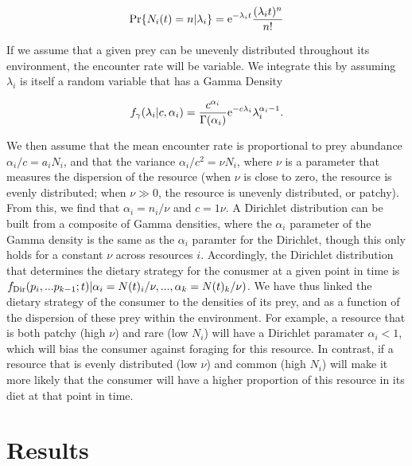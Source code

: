 \documentclass[11pt]{article}
\begin{document}
\begin{equation}
{\rm Pr}\{N_i(t) = n | \lambda_i\} = {\rm e}^{-\lambda_i t}\frac{(\lambda_i t)^n}{n!}
\end{equation}

If we assume that a given prey can be unevenly distributed throughout its environment, the encounter rate will be variable.
We integrate this by assuming $\lambda_i$ is itself a random variable that has a Gamma Density

\begin{equation}
f_\gamma (\lambda_i | c, \alpha_i) = \frac{c^{\alpha_i}}{\Gamma (\alpha_i)}{\rm e}^{-c \lambda_i}\lambda_i^{\alpha_i - 1}.
\end{equation}

\noindent We then assume that the mean encounter rate is proportional to prey abundance $\alpha_i/c = a_i N_i$, and that the variance $\alpha_i/c^2 = \nu N_i$, where $\nu$ is a parameter that measures the dispersion of the resource (when $\nu$ is close to zero, the resource is evenly distributed; when $\nu \gg 0$, the resource is unevenly distributed, or patchy).
From this, we find that $\alpha_i = n_i/\nu$ and $c=1\nu$.
A Dirichlet distribution can be built from a composite of Gamma densities, where the $\alpha_i$ parameter of the Gamma density is the same as the $\alpha_i$ paramter for the Dirichlet, though this only holds for a constant $\nu$ across resources $i$.
Accordingly, the Dirichlet distribution that determines the dietary strategy for the conusmer at a given point in time is $f_{\rm Dir}(p_i,...p_{k-1};t) | \alpha_i=N(t)_i/\nu,...,\alpha_k=N(t)_k/\nu)$.
We have thus linked the dietary strategy of the consumer to the densities of its prey, and as a function of the dispersion of these prey within the environment.
For example, a resource that is both patchy (high $\nu$) and rare (low $N_i$) will have a Dirichlet paramater $\alpha_i < 1$, which will bias the consumer against foraging for this resource.
In contrast, if a resource that is evenly distributed (low $\nu$) and common (high $N_i$) will make it more likely that the consumer will have a higher proportion of this resource in its diet at that point in time.








\section{Results}
\end{document}
